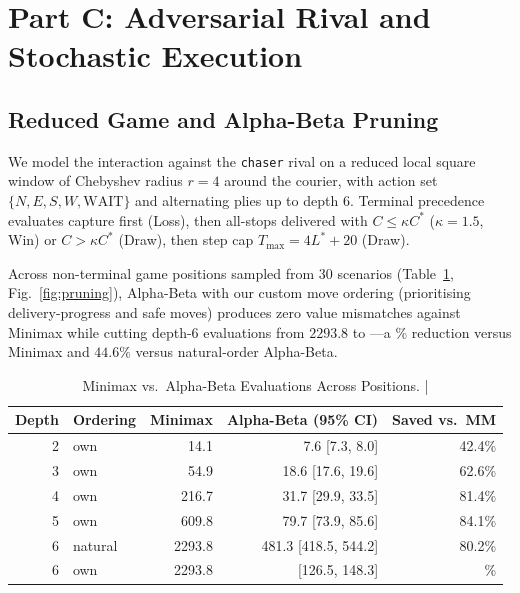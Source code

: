 \documentclass[conference]{IEEEtran}
\begin{document}
\section{Part C: Adversarial Rival and Stochastic Execution}
\subsection{Reduced Game and Alpha-Beta Pruning}
We model the interaction against the \texttt{chaser} rival on a reduced local square window of Chebyshev radius $r=4$ around the courier, with action set $\{N, E, S, W, \text{WAIT}\}$ and alternating plies up to depth $6$. Terminal precedence evaluates capture first (Loss), then all-stops delivered with $C \le \kappa C^*$ ($\kappa=1.5$, Win) or $C > \kappa C^*$ (Draw), then step cap $T_{\max} = 4L^* + 20$ (Draw).

Across \numPartcPruningPositions{} non-terminal game positions sampled from 30 scenarios (Table~\ref{tab:pruning}, Fig.~\ref{fig:pruning}), Alpha-Beta \cite{knuth1975alphabeta} with our custom move ordering (prioritising delivery-progress and safe moves) produces zero value mismatches against Minimax while cutting depth-6 evaluations from $2293.8$ to \numPartcPruningDSixOwnEvals{}—a \numPartcPruningDSixSavedMmPct{}\% reduction versus Minimax and $44.6\%$ versus natural-order Alpha-Beta.

\begin{table}[t]
    \centering
    \caption{Minimax vs.\ Alpha-Beta Evaluations Across \numPartcPruningPositions{} Positions. | \stampline}
    \label{tab:pruning}
    \scriptsize
    \begin{tabular}{@{}rlrrr@{}}
        \toprule
        Depth & Ordering & Minimax & Alpha-Beta (95\% CI) & Saved vs.\ MM \\
        \midrule
        2 & own & 14.1   & 7.6 [7.3, 8.0]       & 42.4\% \\
        3 & own & 54.9   & 18.6 [17.6, 19.6]    & 62.6\% \\
        4 & own & 216.7  & 31.7 [29.9, 33.5]    & 81.4\% \\
        5 & own & 609.8  & 79.7 [73.9, 85.6]    & 84.1\% \\
        6 & natural & 2293.8 & 481.3 [418.5, 544.2] & 80.2\% \\
        6 & own & 2293.8 & \numPartcPruningDSixOwnEvals{} [126.5, 148.3] & \numPartcPruningDSixSavedMmPct{}\% \\
        \bottomrule
    \end{tabular}
\end{table}
\end{document}
